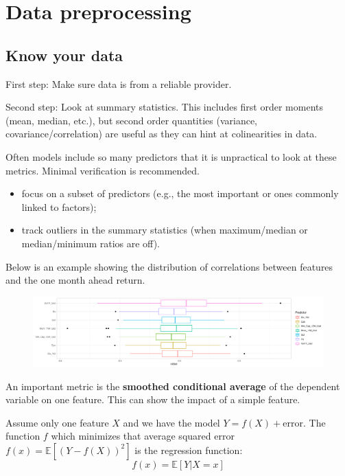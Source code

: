 \section{Data preprocessing}

\subsection{Know your data}

First step: Make sure data is from a reliable provider.

Second step: Look at summary statistics. This includes first order moments (mean, median, etc.), but second order quantities (variance, covariance/correlation) are useful as they can hint at colinearities in data. 

Often models include so many predictors that it is unpractical to look at these metrics. Minimal verification is recommended. 
\begin{itemize}
    \item focus on a subset of predictors (e.g., the most important or ones commonly linked to factors);
    \item track outliers in the summary statistics (when maximum/median or median/minimum ratios are off).
\end{itemize}

Below is an example showing the distribution of correlations between features and the one month ahead return.
\begin{figure}[H]
    \centering
    \includegraphics[width=\textwidth]{part_1/images/know_your_data_fig_1:boxplot.png}
\end{figure}

An important metric is the \textbf{smoothed conditional average} of the dependent variable on one feature. This can show the impact of a simple feature. 

Assume only one feature $X$ and we have the model $Y = f(X) + \text{error}$. The function $f$ which minimizes that average squared error $f(x) = \mathbb{E}[ (Y - f(X))^{2}]$ is the regression function:
\begin{equation}
    f(x) = \mathbb{E}[Y | X = x]
\end{equation}

